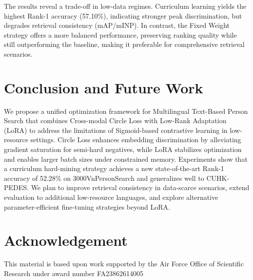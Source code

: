 \documentclass[conference]{IEEEtran}
\begin{document}
The results reveal a trade-off in low-data regimes. Curriculum learning yields the highest Rank-1 accuracy (57.10\%), indicating stronger peak discrimination, but degrades retrieval consistency (mAP/mINP). In contrast, the Fixed Weight strategy offers a more balanced performance, preserving ranking quality while still outperforming the baseline, making it preferable for comprehensive retrieval scenarios.


\section{Conclusion and Future Work}\label{conclusion}

We propose a unified optimization framework for Multilingual Text-Based Person Search that combines Cross-modal Circle Loss with Low-Rank Adaptation (LoRA) to address the limitations of Sigmoid-based contrastive learning in low-resource settings. Circle Loss enhances embedding discrimination by alleviating gradient saturation for semi-hard negatives, while LoRA stabilizes optimization and enables larger batch sizes under constrained memory. Experiments show that a curriculum hard-mining strategy achieves a new state-of-the-art Rank-1 accuracy of 52.28\% on 3000VnPersonSearch and generalizes well to CUHK-PEDES. We plan to improve retrieval consistency in data-scarce scenarios, extend evaluation to additional low-resource languages, and explore alternative parameter-efficient fine-tuning strategies beyond LoRA.


\section*{Acknowledgement}
This material is based upon work supported by the Air Force Office of Scientific Research under
award number FA23862614005

\newpage
{}


\end{document}
